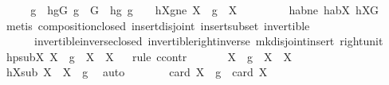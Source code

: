 \begin{isabellebody}
\ \ \isamarkupfalse%
\ \isamarkupfalse%
\ g\ \ hgG{\isacharcolon}{\kern0pt}\ {\isachardoublequoteopen}g\ {\isasymin}\ G{\isachardoublequoteclose}\ \ hg{}{\isacharcolon}{\kern0pt}\ {\isachardoublequoteopen}g\ {\isasymnoteq}\ {\isasymone}{\isachardoublequoteclose}\ \ hXgne{\isacharcolon}{\kern0pt}\ {\isachardoublequoteopen}{\isacharparenleft}{\kern0pt}X\ {\isasymcdots}\ {\isacharbraceleft}{\kern0pt}g{\isacharbraceright}{\kern0pt}{\isacharparenright}{\kern0pt}\ {\isasyminter}\ X\ {\isasymnoteq}\ {\isacharbraceleft}{\kern0pt}{\isacharbraceright}{\kern0pt}{\isachardoublequoteclose}\ \isanewline
\ \ \ \ \isamarkupfalse%
\ habne\ habX\ hXG\ \isamarkupfalse%
\ {\isacharparenleft}{\kern0pt}metis\ composition{\isacharunderscore}{\kern0pt}closed\ insert{\isacharunderscore}{\kern0pt}disjoint{\isacharparenleft}{\kern0pt}{}{\isacharparenright}{\kern0pt}\ insert{\isacharunderscore}{\kern0pt}subset\ invertible\ \isanewline
\ \ \ \ \ \ invertible{\isacharunderscore}{\kern0pt}inverse{\isacharunderscore}{\kern0pt}closed\ invertible{\isacharunderscore}{\kern0pt}right{\isacharunderscore}{\kern0pt}inverse{}\ mk{\isacharunderscore}{\kern0pt}disjoint{\isacharunderscore}{\kern0pt}insert\ right{\isacharunderscore}{\kern0pt}unit{\isacharparenright}{\kern0pt}\isanewline
\ \ \isamarkupfalse%
\ hpsubX{\isacharcolon}{\kern0pt}\ {\isachardoublequoteopen}{\isacharparenleft}{\kern0pt}X\ {\isasymcdots}\ {\isacharbraceleft}{\kern0pt}g{\isacharbraceright}{\kern0pt}{\isacharparenright}{\kern0pt}\ {\isasyminter}\ X\ {\isasymsubset}\ X{\isachardoublequoteclose}\isanewline
\ \ \isamarkupfalse%
{\isacharparenleft}{\kern0pt}rule\ ccontr{\isacharparenright}{\kern0pt}\isanewline
\ \ \ \ \isamarkupfalse%
\ {\isachardoublequoteopen}{\isasymnot}\ {\isacharparenleft}{\kern0pt}X\ {\isasymcdots}\ {\isacharbraceleft}{\kern0pt}g{\isacharbraceright}{\kern0pt}{\isacharparenright}{\kern0pt}\ {\isasyminter}\ X\ {\isasymsubset}\ X{\isachardoublequoteclose}\isanewline
\ \ \ \ \isamarkupfalse%
\ \isamarkupfalse%
\ hXsub{\isacharcolon}{\kern0pt}\ {\isachardoublequoteopen}X\ {\isasymsubseteq}\ X\ {\isasymcdots}\ {\isacharbraceleft}{\kern0pt}g{\isacharbraceright}{\kern0pt}{\isachardoublequoteclose}\ \isamarkupfalse%
\ auto\isanewline
\ \ \ \ \isamarkupfalse%
\ \isamarkupfalse%
\ {\isachardoublequoteopen}card\ X\ {\isasymcdots}\ {\isacharbraceleft}{\kern0pt}g{\isacharbraceright}{\kern0pt}\ {\isacharequal}{\kern0pt}\ card\ X{\isachardoublequoteclose}\ \isamarkupfalse%

\end{isabellebody}
